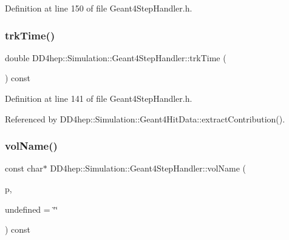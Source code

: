 Definition at line 150 of file Geant4\+Step\+Handler.\+h.

\hypertarget{class_d_d4hep_1_1_simulation_1_1_geant4_step_handler_aab3ccbc05dede7d3b67c0623cfbaadfb}{}\label{class_d_d4hep_1_1_simulation_1_1_geant4_step_handler_aab3ccbc05dede7d3b67c0623cfbaadfb} 
\subsubsection{\texorpdfstring{trk\+Time()}{trkTime()}}
{\footnotesize\ttfamily double D\+D4hep\+::\+Simulation\+::\+Geant4\+Step\+Handler\+::trk\+Time (\begin{DoxyParamCaption}{ }\end{DoxyParamCaption}) const\hspace{0.3cm}{\ttfamily [inline]}}



Definition at line 141 of file Geant4\+Step\+Handler.\+h.



Referenced by D\+D4hep\+::\+Simulation\+::\+Geant4\+Hit\+Data\+::extract\+Contribution().

\hypertarget{class_d_d4hep_1_1_simulation_1_1_geant4_step_handler_ad9fc43129fcb070b2198d3dc37ad1242}{}\label{class_d_d4hep_1_1_simulation_1_1_geant4_step_handler_ad9fc43129fcb070b2198d3dc37ad1242} 
\subsubsection{\texorpdfstring{vol\+Name()}{volName()}}
{\footnotesize\ttfamily const char$\ast$ D\+D4hep\+::\+Simulation\+::\+Geant4\+Step\+Handler\+::vol\+Name (\begin{DoxyParamCaption}\item[{const G4\+Step\+Point $\ast$}]{p,  }\item[{const char $\ast$}]{undefined = {\ttfamily \char`\"{}\char`\"{}} }\end{DoxyParamCaption}) const\hspace{0.3cm}{\ttfamily [inline]}}



